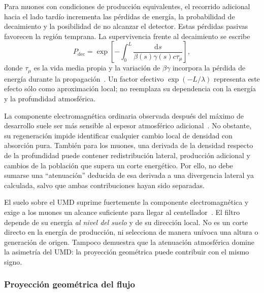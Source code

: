 Para muones con condiciones de producción equivalentes, el recorrido adicional hacia el lado tardío incrementa las pérdidas de energía, la probabilidad de decaimiento y la posibilidad de no alcanzar el detector. Estas pérdidas pasivas favorecen la región temprana. La supervivencia frente al decaimiento se escribe
\begin{equation}
P_{\mathrm{dec}}=
\exp\left[-\int_0^L\frac{\mathrm ds}{\beta(s)\gamma(s)c\tau_\mu}\right],
\label{eq:fen2026:supervivencia}
\end{equation}
donde $\tau_\mu$ es la vida media propia y la variación de $\beta\gamma$ incorpora la pérdida de energía durante la propagación~\cite{Cazon2012}. Un factor efectivo $\exp(-L/\lambda)$ representa este efecto sólo como aproximación local; no reemplaza su dependencia con la energía y la profundidad atmosférica.

La componente electromagnética ordinaria observada después del máximo de desarrollo suele ser más sensible al espesor atmosférico adicional~\cite{Pryke1998,BradfieldThesis}. No obstante, su regeneración impide identificar cualquier cambio local de densidad con absorción pura. También para los muones, una derivada de la densidad respecto de la profundidad puede contener redistribución lateral, producción adicional y cambios de la población que supera un corte energético. Por ello, no debe sumarse una ``atenuación'' deducida de esa derivada a una divergencia lateral ya calculada, salvo que ambas contribuciones hayan sido separadas.

El suelo sobre el UMD suprime fuertemente la componente electromagnética y exige a los muones un alcance suficiente para llegar al centellador~\cite{UMD_Design2016}. El filtro depende de su energía \emph{al nivel del suelo} y de su dirección local. No es un corte directo en la energía de producción, ni selecciona de manera unívoca una altura o generación de origen. Tampoco demuestra que la atenuación atmosférica domine la asimetría del UMD: la proyección geométrica puede contribuir con el mismo signo.

\subsubsection{Proyección geométrica del flujo}
\label{subsubsec:divergencia}

